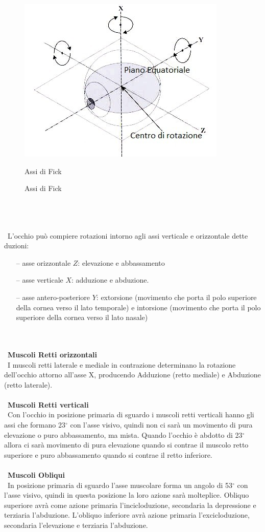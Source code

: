 \begin{figure}[h!]
	\centering
	\includegraphics[scale=0.49]{source/immagini/Assi.jpg}
	\caption{Assi di Fick}{Assi di Fick}
	\label{fig:test7}
\end{figure}
\\\ \\\ \\\
L’occhio può compiere rotazioni intorno agli assi verticale e orizzontale dette duzioni:
 \begin{itemize}
 \itemsep-0.7em 
 \item[--]asse orizzontale $Z$: elevazione e abbassamento
 \item[--]asse verticale $X$: adduzione e abduzione.
 \item[--]asse antero-posteriore $Y$: extorsione (movimento che porta il polo superiore della cornea verso il lato temporale) e intorsione (movimento che porta il polo superiore della cornea verso il lato nasale)
 \end{itemize}
\\\ \\\
\textbf{Muscoli Retti orizzontali}
\\\
I muscoli retti laterale e mediale in contrazione determinano la rotazione dell’occhio attorno all’asse X, producendo Adduzione (retto mediale) e Abduzione (retto laterale).
\\\ \\\	
\textbf{Muscoli Retti verticali}
\\\
Con l’occhio in posizione primaria di sguardo i muscoli retti verticali hanno gli assi che formano 23$^{\circ}$ con l’asse visivo, quindi non ci sarà un movimento di pura elevazione o puro abbassamento, ma mista. Quando l’occhio è abdotto di 23$^{\circ}$ allora ci sarà movimento di pura elevazione quando si contrae il muscolo retto superiore e puro abbassamento quando si contrae il retto inferiore.
\\\ \\\
\textbf{Muscoli Obliqui}
\\\ 
In posizione primaria di sguardo l’asse muscolare forma un angolo di 53$^{\circ}$ con l’asse visivo, quindi in questa posizione la loro azione sarà molteplice. Obliquo superiore avrà come azione primaria l’incicloduzione, secondaria la depressione e terziaria l’abduzione. L’obliquo inferiore avrà azione primaria l’excicloduzione, secondaria l’elevazione e terziaria l’abduzione. 


